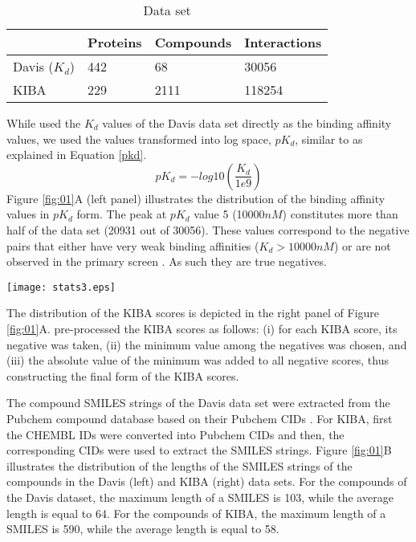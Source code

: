 \documentclass[11pt,letterpaper]{article}
\begin{document}
\begin{table}[h]
\caption{Data set} \label{Tab:01} {
\begin{tabular}{@{}llll@{}}\hline
& Proteins & Compounds & Interactions\\\hline
Davis ($K_d$) & 442 & 68 & 30056 \\ \hline
KIBA  & 229 & 2111 & 118254 \\ \hline
\end{tabular}}
\end{table}

While \cite{pahikkala2014toward} used the $K_d$ values of the Davis data set directly as the binding affinity values, we used the values transformed into log space,  $pK_d$, similar to \cite{he2017simboost} as explained in Equation \ref{pkd}.
\begin{equation}\label{pkd}
pK_d= -log10 (\frac{K_d}{1e9})
\end{equation}
Figure \ref{fig:01}A (left panel) illustrates the distribution of the binding affinity values in $pK_d$  form. The peak at $pK_d$ value 5 (10000$nM$)  constitutes more than half of the data set (20931 out of 30056). These values correspond to the negative pairs that either have very weak binding affinities ($K_d > 10000nM$) or are not observed in the primary screen \cite{pahikkala2014toward}. As such they are true negatives.

\begin{figure*}[htp!]\centerline{\texttt{[image: stats3.eps]}}
\caption{Summary of the Davis (left panel) and KIBA  (right panel) data sets. A) Distribution of binding affinity values B) Distribution of the lengths of the SMILES strings C) Distribution of the lengths of the protein sequences .} \label{fig:01}
\end{figure*}

The distribution of the KIBA scores is depicted in the right panel of Figure \ref{fig:01}A. \cite{he2017simboost} pre-processed the KIBA scores as follows: (i)  for each KIBA score, its negative was taken, (ii) the minimum value among the negatives was chosen, and (iii) the  absolute value of the minimum was added to all negative scores, thus constructing the final form of the KIBA scores. 

The compound SMILES strings of the Davis data set were extracted from the Pubchem compound database based on their Pubchem CIDs \cite{bolton2008pubchem}.  For KIBA, first the CHEMBL IDs were converted into Pubchem CIDs and  then, the corresponding CIDs were used to extract the SMILES strings. Figure \ref{fig:01}B  illustrates the distribution of the lengths of the SMILES strings of the compounds in the Davis (left) and KIBA (right) data sets. For the compounds of the Davis dataset, the maximum length of a SMILES is 103, while the average length is equal to 64.  For the compounds of KIBA, the maximum length of a SMILES is 590, while the average length is equal to 58. 
\end{document}
